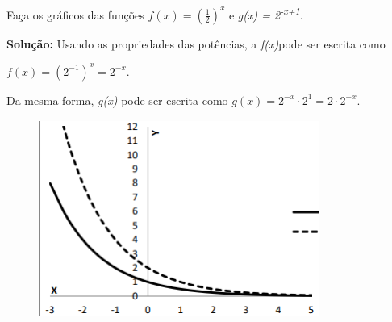 \begin{texemplo}
Faça os gráficos das funções   \( f \left( x \right) = \left( \frac{1}{2} \right) ^{x} \) e  \textit{g(x) = 2\textsuperscript{-x+1}}.

\textbf{Solução:} Usando as propriedades das potências, a \textit{f(x)}pode ser escrita como  

  \( f \left( x \right) = \left( 2^{-1} \right) ^{x}=2^{-x}. \) 

Da mesma forma, \textit{g(x)} pode ser escrita como $g(x) = 2^{-x} \cdot 2^{1}=2 \cdot 2^{-x}$. 

\begin{figure}[H]
	\begin{Center}
		\includegraphics[width=3.62in,height=2.55in]{capitulos/potencias_e_funcoes_exponenciais/media/image10.png}
	\end{Center}
\end{figure}

\qedsymbol{}
\end{texemplo}

